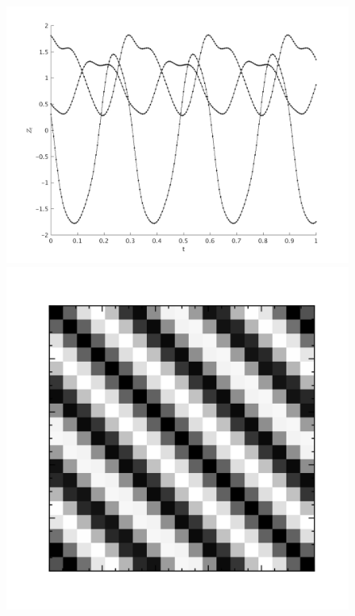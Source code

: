 \begin{enumerate}
\begin{figure}
\centering
\includegraphics[scale=.5]{figures/per3.png}
\includegraphics[scale=.4]{figures/covariancematrix_per.png}

\end{figure}
\end{enumerate}
